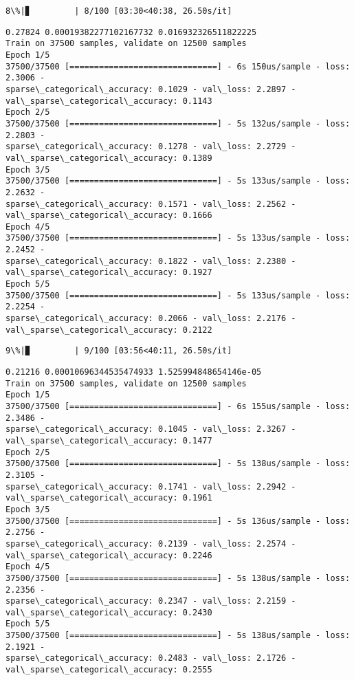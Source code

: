 \documentclass[11pt]{article}
\begin{document}
    \begin{Verbatim}[commandchars=\\\{\}]
  8\%|▊         | 8/100 [03:30<40:38, 26.50s/it]
    \end{Verbatim}

    \begin{Verbatim}[commandchars=\\\{\}]
0.27824 0.00019382277102167732 0.016932326511822225
Train on 37500 samples, validate on 12500 samples
Epoch 1/5
37500/37500 [==============================] - 6s 150us/sample - loss: 2.3006 -
sparse\_categorical\_accuracy: 0.1029 - val\_loss: 2.2897 -
val\_sparse\_categorical\_accuracy: 0.1143
Epoch 2/5
37500/37500 [==============================] - 5s 132us/sample - loss: 2.2803 -
sparse\_categorical\_accuracy: 0.1278 - val\_loss: 2.2729 -
val\_sparse\_categorical\_accuracy: 0.1389
Epoch 3/5
37500/37500 [==============================] - 5s 133us/sample - loss: 2.2632 -
sparse\_categorical\_accuracy: 0.1571 - val\_loss: 2.2562 -
val\_sparse\_categorical\_accuracy: 0.1666
Epoch 4/5
37500/37500 [==============================] - 5s 133us/sample - loss: 2.2452 -
sparse\_categorical\_accuracy: 0.1822 - val\_loss: 2.2380 -
val\_sparse\_categorical\_accuracy: 0.1927
Epoch 5/5
37500/37500 [==============================] - 5s 133us/sample - loss: 2.2254 -
sparse\_categorical\_accuracy: 0.2066 - val\_loss: 2.2176 -
val\_sparse\_categorical\_accuracy: 0.2122
    \end{Verbatim}

    \begin{Verbatim}[commandchars=\\\{\}]
  9\%|▉         | 9/100 [03:56<40:11, 26.50s/it]
    \end{Verbatim}

    \begin{Verbatim}[commandchars=\\\{\}]
0.21216 0.00010696344535474933 1.525994848654146e-05
Train on 37500 samples, validate on 12500 samples
Epoch 1/5
37500/37500 [==============================] - 6s 155us/sample - loss: 2.3486 -
sparse\_categorical\_accuracy: 0.1045 - val\_loss: 2.3267 -
val\_sparse\_categorical\_accuracy: 0.1477
Epoch 2/5
37500/37500 [==============================] - 5s 138us/sample - loss: 2.3105 -
sparse\_categorical\_accuracy: 0.1741 - val\_loss: 2.2942 -
val\_sparse\_categorical\_accuracy: 0.1961
Epoch 3/5
37500/37500 [==============================] - 5s 136us/sample - loss: 2.2756 -
sparse\_categorical\_accuracy: 0.2139 - val\_loss: 2.2574 -
val\_sparse\_categorical\_accuracy: 0.2246
Epoch 4/5
37500/37500 [==============================] - 5s 138us/sample - loss: 2.2356 -
sparse\_categorical\_accuracy: 0.2347 - val\_loss: 2.2159 -
val\_sparse\_categorical\_accuracy: 0.2430
Epoch 5/5
37500/37500 [==============================] - 5s 138us/sample - loss: 2.1921 -
sparse\_categorical\_accuracy: 0.2483 - val\_loss: 2.1726 -
val\_sparse\_categorical\_accuracy: 0.2555
    \end{Verbatim}
\end{document}
